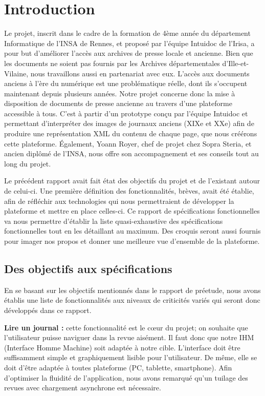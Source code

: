 \section{Introduction}
\label{sec:intro}

Le projet, inscrit dans le cadre de la formation de 4ème année du département Informatique de l’INSA de Rennes, et proposé par l’équipe
Intuidoc de l’Irisa, a pour but d’améliorer l’accès aux archives de presse locale et ancienne. Bien que les documents ne soient pas fournis par les Archives départementales d'Ille-et-Vilaine, nous travaillons aussi en partenariat avec eux. L'accès aux documents anciens à l'ère du numérique est une problématique réelle, dont ils s'occupent maintenant depuis plusieurs années. Notre projet concerne donc la mise à disposition de documents de presse ancienne au travers d'une plateforme accessible à tous. C'est à partir d'un prototype conçu par l'équipe Intuidoc et permettant d'interpréter des images de journaux anciens (XIXe et XXe) afin de produire une représentation XML du contenu de chaque page, que nous créérons cette plateforme. Également, Yoann Royer, chef de projet chez Sopra Steria, et ancien diplômé de l'INSA, nous offre son accompagnement et ses conseils tout au long du projet.

Le précédent rapport avait fait état des objectifs du projet et de l'existant autour de celui-ci. Une première définition des fonctionnalités, brèves, avait été établie, afin de réfléchir aux technologies qui nous permettraient de développer la plateforme et mettre en place celles-ci. Ce rapport de spécifications fonctionnelles va nous permettre d'établir la liste quasi-exhaustive des spécifications fonctionnelles tout en les détaillant au maximum. Des croquis seront aussi fournis pour imager nos propos et donner une meilleure vue d'ensemble de la plateforme.

    \subsection{Des objectifs aux spécifications}
    \label{sec:objectifs}
    En se basant sur les objectifs mentionnés dans le rapport de préetude, nous avons établis une liste de fonctionnalités aux niveaux de criticités variés qui seront donc développés dans ce rapport.


    \textbf{Lire un journal :} cette fonctionnalité est le cœur du projet; on souhaite que l’utilisateur puisse naviguer dans la revue aisément.
    Il faut donc que notre IHM (Interface Homme Machine) soit adaptée à notre cible. L’interface doit être suffisamment simple et graphiquement lisible pour l’utilisateur. De même, elle se doit d’être adaptée à toutes plateforme (PC, tablette, smartphone). Afin d’optimiser la fluidité de l’application, nous avons remarqué
    qu’un tuilage des revues avec chargement asynchrone est nécessaire.


